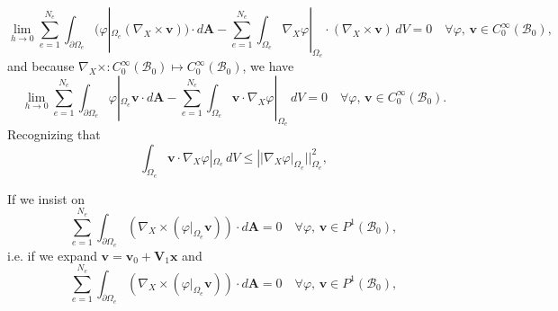 \documentclass[12pt]{article}
\begin{document}
\begin{equation}
	\lim_{h \rightarrow 0} \sum_{e = 1}^{N_e} \int_{\partial \Omega_e} (\varphi|_{\Omega_e} (\nabla_X \times \mathbf{v})) \cdot d\mathbf{A} - \sum_{e = 1}^{N_e} \int_{\Omega_e} \nabla_X \varphi|_{\Omega_e} \cdot (\nabla_X \times \mathbf{v}) \, dV = 0 \quad \forall \varphi, \, \mathbf{v} \in C^\infty_0 (\mathcal{B}_0),
\end{equation}
and because $\nabla_X \times : C^\infty_0 (\mathcal{B}_0) \mapsto C^\infty_0 (\mathcal{B}_0)$, we have
\begin{equation}
	\lim_{h \rightarrow 0} \sum_{e = 1}^{N_e} \int_{\partial \Omega_e} \varphi|_{\Omega_e} \mathbf{v} \cdot d\mathbf{A} - \sum_{e = 1}^{N_e} \int_{\Omega_e} \mathbf{v} \cdot \nabla_X \varphi|_{\Omega_e} \, dV = 0 \quad \forall \varphi, \, \mathbf{v} \in C^\infty_0 (\mathcal{B}_0).
\end{equation}
Recognizing that
\begin{equation}
	\int_{\Omega_e} \mathbf{v} \cdot \nabla_X \varphi|_{\Omega_e} \, dV \leq  || \nabla_X \varphi|_{\Omega_e} ||^2_{\Omega_e},
\end{equation}

If we insist on
\begin{equation}
	\sum_{e = 1}^{N_e} \int_{\partial \Omega_e} (\nabla_X \times (\varphi|_{\Omega_e} \mathbf{v})) \cdot d\mathbf{A} = 0 \quad \forall \varphi, \, \mathbf{v} \in P^1 (\mathcal{B}_0),
\end{equation}
i.e. if we expand $\mathbf{v} = \mathbf{v}_0 + \mathbf{V}_1 \mathbf{x}$ and 
\begin{equation}
	\sum_{e = 1}^{N_e} \int_{\partial \Omega_e} (\nabla_X \times (\varphi|_{\Omega_e} \mathbf{v})) \cdot d\mathbf{A} = 0 \quad \forall \varphi, \, \mathbf{v} \in P^1 (\mathcal{B}_0),
\end{equation}
\end{document}
